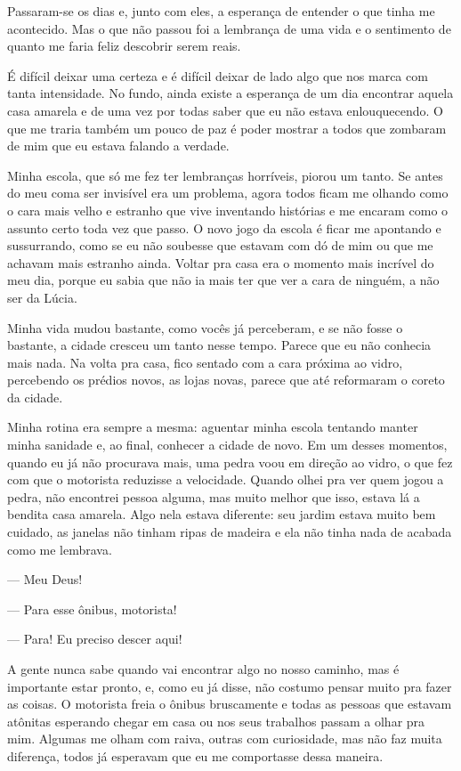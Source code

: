 Passaram-se os dias e, junto com eles, a esperança de entender o que tinha me acontecido. Mas o que não passou foi a lembrança de uma vida e o sentimento de quanto me faria feliz descobrir serem reais.

É difícil deixar uma certeza e é difícil deixar de lado algo que nos marca com tanta intensidade. No fundo, ainda existe a esperança de um dia encontrar aquela casa amarela e de uma vez por todas saber que eu não estava enlouquecendo. O que me traria também um pouco de paz é poder mostrar a todos que zombaram de mim que eu estava falando a verdade.

Minha escola, que só me fez ter lembranças horríveis, piorou um tanto. Se antes do meu coma ser invisível era um problema, agora todos ficam me olhando como o cara mais velho e estranho que vive inventando histórias e me encaram como o assunto certo toda vez que passo. O novo jogo da escola é ficar me apontando e sussurrando, como se eu não soubesse que estavam com dó de mim ou que me achavam mais estranho ainda. Voltar pra casa era o momento mais incrível do meu dia, porque eu sabia que não ia mais ter que ver a cara de ninguém, a não ser da Lúcia.

Minha vida mudou bastante, como vocês já perceberam, e se não fosse o bastante, a cidade cresceu um tanto nesse tempo. Parece que eu não conhecia mais nada. Na volta pra casa, fico sentado com a cara próxima ao vidro, percebendo os prédios novos, as lojas novas, parece que até reformaram o coreto da cidade.

Minha rotina era sempre a mesma: aguentar minha escola tentando manter minha sanidade e, ao final, conhecer a cidade de novo. Em um desses momentos, quando eu já não procurava mais, uma pedra voou em direção ao vidro, o que fez com que o motorista reduzisse a velocidade. Quando olhei pra ver quem jogou a pedra, não encontrei pessoa alguma, mas muito melhor que isso, estava lá a bendita casa amarela. Algo nela estava diferente: seu jardim estava muito bem cuidado, as janelas não tinham ripas de madeira e ela não tinha nada de acabada como me lembrava.

— Meu Deus!

— Para esse ônibus, motorista!

— Para! Eu preciso descer aqui!

A gente nunca sabe quando vai encontrar algo no nosso caminho, mas é importante estar pronto, e, como eu já disse, não costumo pensar muito pra fazer as coisas. O motorista freia o ônibus bruscamente e todas as pessoas que estavam atônitas esperando chegar em casa ou nos seus trabalhos passam a olhar pra mim. Algumas me olham com raiva, outras com curiosidade, mas não faz muita diferença, todos já esperavam que eu me comportasse dessa maneira.


